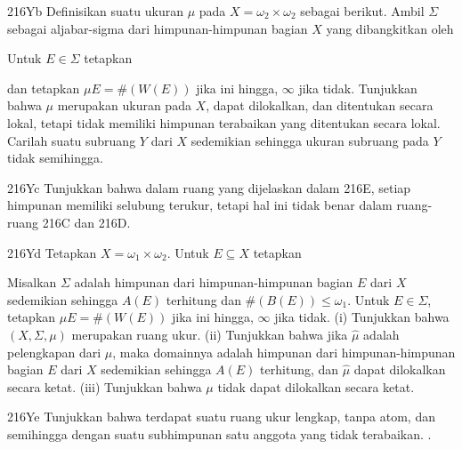 {\spheader 216Yb Definisikan suatu ukuran $\mu$ pada
$X=\omega_2\times\omega_2$ sebagai berikut.   Ambil $\Sigma$ sebagai
aljabar-sigma dari himpunan-himpunan bagian $X$ yang dibangkitkan oleh


\noindent Untuk $E\in\Sigma$ tetapkan


\noindent dan tetapkan $\mu E=\#(W(E))$ jika ini hingga, $\infty$ jika
tidak. Tunjukkan bahwa $\mu$ merupakan ukuran pada $X$, dapat dilokalkan,
dan ditentukan secara lokal, tetapi tidak memiliki himpunan terabaikan
yang ditentukan secara lokal.   Carilah suatu subruang $Y$ dari $X$
sedemikian sehingga ukuran subruang pada $Y$ tidak semihingga.

\spheader 216Yc Tunjukkan bahwa dalam ruang yang dijelaskan dalam 216E,
setiap himpunan memiliki selubung terukur, tetapi hal ini tidak benar
dalam ruang-ruang 216C dan 216D.

\spheader 216Yd Tetapkan $X=\omega_1\times\omega_2$.   Untuk
$E\subseteq X$ tetapkan


\ifdim\pagewidth>400pt
\Centerline{$B(E)=\{\zeta:$ terdapat $\xi$, $\zeta'$ sedemikian sehingga
$\zeta<\zeta'<\omega_2$ dan tepat satu dari
$(\xi,\zeta)$, $(\xi,\zeta')$ termasuk dalam $E\}$,}
\else
$$\eqalign{B(E)
&=\{\zeta:\text{ terdapat }\xi,\,\zeta'\text{ sedemikian sehingga }
\zeta<\zeta'<\omega_2\cr&
\mskip100mu\text{ dan tepat satu dari }
(\xi,\zeta),\,(\xi,\zeta')\text{ termasuk dalam }E\},
\cr}$$
\fi


\noindent Misalkan $\Sigma$ adalah himpunan dari himpunan-himpunan bagian
$E$ dari $X$ sedemikian sehingga $A(E)$ terhitung dan
$\#(B(E))\le\omega_1$.   Untuk $E\in\Sigma$, tetapkan
$\mu E=\#(W(E))$ jika ini hingga, $\infty$ jika tidak.   (i) Tunjukkan
bahwa $(X,\Sigma,\mu)$ merupakan ruang ukur.   (ii) Tunjukkan bahwa jika
$\hat\mu$ adalah pelengkapan dari $\mu$, maka domainnya adalah himpunan
dari himpunan-himpunan bagian $E$ dari $X$ sedemikian sehingga $A(E)$
terhitung, dan $\hat\mu$ dapat dilokalkan secara ketat.   (iii) Tunjukkan
bahwa $\mu$ tidak dapat dilokalkan secara ketat.

\spheader 216Ye Tunjukkan bahwa terdapat suatu ruang ukur
lengkap, tanpa atom, dan semihingga dengan suatu subhimpunan satu anggota
yang tidak terabaikan.
.

}%

